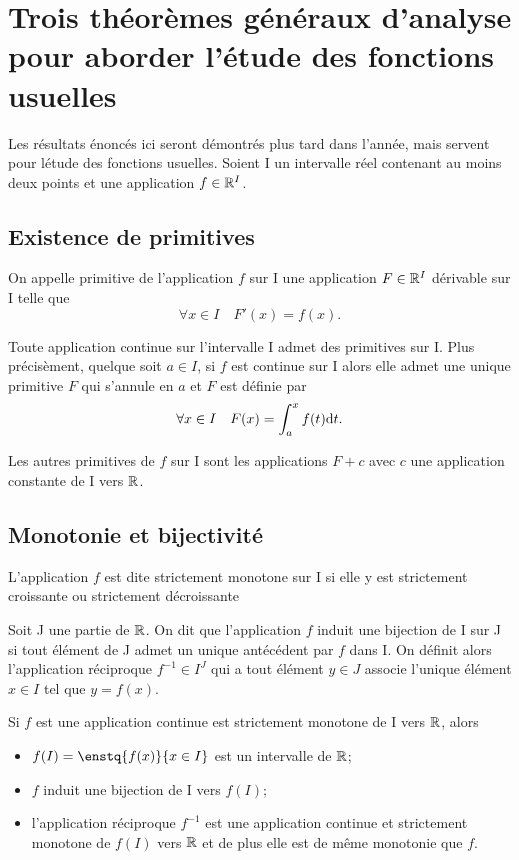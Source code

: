 \chapter{Trois théorèmes généraux d'analyse pour aborder l'étude des fonctions usuelles}
\label{chap:theogen}
Les résultats énoncés ici seront démontrés plus tard dans l'année, mais servent pour létude des fonctions usuelles. Soient I un intervalle réel contenant au moins deux points et une application $f \in \mathbb{R}^I$.
%
\section{Existence de primitives}
%
\begin{defdef}
  On appelle primitive de l'application $f$ sur I une application $F \in \mathbb{R}^I$ dérivable sur I telle que
  \begin{equation}
    \forall x \in I \quad F'(x)=f(x).
  \end{equation}
\end{defdef}
\begin{theo}
  Toute application continue sur l'intervalle I admet des primitives sur I. Plus précisèment, quelque soit $a \in I$, si $f$ est continue sur I alors elle admet une unique primitive $F$ qui s'annule en $a$ et $F$ est définie par
  \begin{equation}
    \forall x \in I \quad F(x)=\int_{a}^x f(t) \mathrm{d} t.
  \end{equation}
\end{theo}
Les autres primitives de $f$ sur I sont les applications $F+c$ avec $c$ une application constante de I vers $\mathbb{R}$.
%
\section{Monotonie et bijectivité}
%
\begin{defdef}
  L'application $f$ est dite strictement monotone sur I si elle y est strictement croissante ou strictement décroissante
\end{defdef}
\begin{defdef}
  Soit J une partie de $\mathbb{R}$. On dit que l'application $f$ induit une bijection de I sur J si tout élément de J admet un unique antécédent par $f$ dans I. On définit alors l'application réciproque $f^{-1} \in I^J$ qui a tout élément $y \in J$ associe l'unique élément $x \in I$ tel que $y=f(x)$.
\end{defdef}
\begin{theo}
  Si $f$ est une application continue est strictement monotone de I vers $\mathbb{R}$, alors
  \begin{itemize}
  \item $f(I)=\enstq{f(x)}{x \in I}$ est un intervalle de $\mathbb{R}$;
  \item $f$ induit une bijection de I vers $f(I)$;
  \item l'application réciproque $f^{-1}$ est une application continue et strictement monotone de $f(I)$ vers $\mathbb{R}$ et de plus elle est de même monotonie que $f$.
  \end{itemize}
\end{theo}
%
